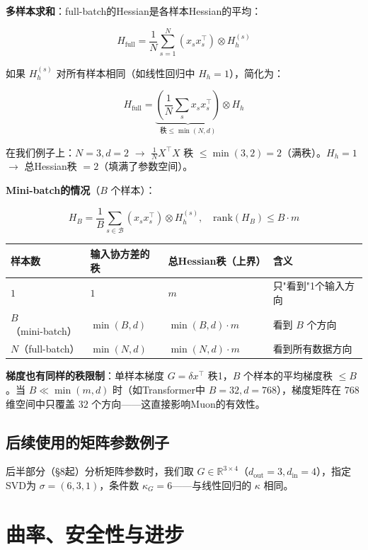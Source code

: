 \documentclass[12pt,a4paper]{article}
\begin{document}
\textbf{多样本求和}：full-batch的Hessian是各样本Hessian的平均：

\[H_{\text{full}} = \frac{1}{N}\sum_{s=1}^N (x_s x_s^\top) \otimes H_h^{(s)}\]

如果 $H_h^{(s)}$ 对所有样本相同（如线性回归中 $H_h = 1$），简化为：

\[H_{\text{full}} = \underbrace{\left(\frac{1}{N}\sum_s x_s x_s^\top\right)}_{\text{秩} \le \min(N, d)} \otimes H_h\]

在我们例子上：$N=3, d=2$ $\to$ $\frac{1}{N}X^\top X$ 秩 $\le \min(3,2) = 2$（满秩）。$H_h = 1$ $\to$ 总Hessian秩 $= 2$（填满了参数空间）。

\textbf{Mini-batch的情况}（$B$ 个样本）：

\[H_B = \frac{1}{B}\sum_{s \in \mathcal{B}} (x_s x_s^\top) \otimes H_h^{(s)}, \quad \text{rank}(H_B) \le B \cdot m\]

\begin{center}\small
\begin{longtable}{|l|l|l|l|}
\hline
样本数 & 输入协方差的秩 & 总Hessian秩（上界） & 含义 \\
\hline
$1$ & $1$ & $m$ & 只"看到"1个输入方向 \\
$B$（mini-batch） & $\min(B, d)$ & $\min(B, d) \cdot m$ & 看到 $B$ 个方向 \\
$N$（full-batch） & $\min(N, d)$ & $\min(N, d) \cdot m$ & 看到所有数据方向 \\
\hline
\end{longtable}
\end{center}

\textbf{梯度也有同样的秩限制}：单样本梯度 $G = \delta x^\top$ 秩1，$B$ 个样本的平均梯度秩 $\le B$。当 $B \ll \min(m, d)$ 时（如Transformer中 $B=32, d=768$），梯度矩阵在 $768$ 维空间中只覆盖 $32$ 个方向——这直接影响Muon的有效性。

\subsection{后续使用的矩阵参数例子}

后半部分（§8起）分析矩阵参数时，我们取 $G \in \mathbb{R}^{3 \times 4}$（$d_{\text{out}}=3, d_{\text{in}}=4$），指定SVD为 $\sigma = (6, 3, 1)$，条件数 $\kappa_G = 6$——与线性回归的 $\kappa$ 相同。


\section{曲率、安全性与进步}
\end{document}
